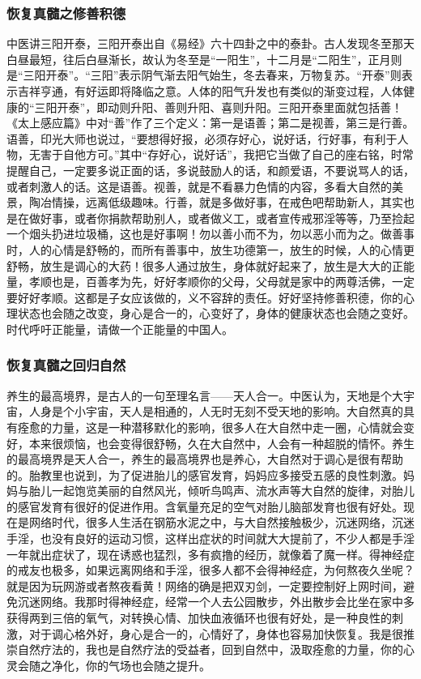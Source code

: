 \subsubsection{恢复真髓之修善积德}

中医讲三阳开泰，三阳开泰出自《易经》六十四卦之中的泰卦。古人发现冬至那天白昼最短，往后白昼渐长，故认为冬至是“一阳生”，十二月是“二阳生”，正月则是“三阳开泰”。“三阳”表示阴气渐去阳气始生，冬去春来，万物复苏。“开泰”则表示吉祥亨通，有好运即将降临之意。人体的阳气升发也有类似的渐变过程，人体健康的“三阳开泰”，即动则升阳、善则升阳、喜则升阳。三阳开泰里面就包括善！《太上感应篇》中对“善”作了三个定义：第一是语善；第二是视善，第三是行善。语善，印光大师也说过，“要想得好报，必须存好心，说好话，行好事，有利于人物，无害于自他方可。”其中“存好心，说好话”，我把它当做了自己的座右铭，时常提醒自己，一定要多说正面的话，多说鼓励人的话，和颜爱语，不要说骂人的话，或者刺激人的话。这是语善。视善，就是不看暴力色情的内容，多看大自然的美景，陶冶情操，远离低级趣味。行善，就是多做好事，在戒色吧帮助新人，其实也是在做好事，或者你捐款帮助别人，或者做义工，或者宣传戒邪淫等等，乃至捡起一个烟头扔进垃圾桶，这也是好事啊！勿以善小而不为，勿以恶小而为之。做善事时，人的心情是舒畅的，而所有善事中，放生功德第一，放生的时候，人的心情更舒畅，放生是调心的大药！很多人通过放生，身体就好起来了，放生是大大的正能量，孝顺也是，百善孝为先，好好孝顺你的父母，父母就是家中的两尊活佛，一定要好好孝顺。这都是子女应该做的，义不容辞的责任。好好坚持修善积德，你的心理状态也会随之改变，身心是合一的，心变好了，身体的健康状态也会随之变好。时代呼吁正能量，请做一个正能量的中国人。

\subsubsection{恢复真髓之回归自然}

养生的最高境界，是古人的一句至理名言——天人合一。中医认为，天地是个大宇宙，人身是个小宇宙，天人是相通的，人无时无刻不受天地的影响。大自然真的具有痊愈的力量，这是一种潜移默化的影响，很多人在大自然中走一圈，心情就会变好，本来很烦恼，也会变得很舒畅，久在大自然中，人会有一种超脱的情怀。养生的最高境界是天人合一，养生的最高境界也是养心，大自然对于调心是很有帮助的。胎教里也说到，为了促进胎儿的感官发育，妈妈应多接受五感的良性刺激。妈妈与胎儿一起饱览美丽的自然风光，倾听鸟鸣声、流水声等大自然的旋律，对胎儿的感官发育有很好的促进作用。含氧量充足的空气对胎儿脑部发育也很有好处。现在是网络时代，很多人生活在钢筋水泥之中，与大自然接触极少，沉迷网络，沉迷手淫，也没有良好的运动习惯，这样出症状的时间就大大提前了，不少人都是手淫一年就出症状了，现在诱惑也猛烈，多有疯撸的经历，就像着了魔一样。得神经症的戒友也极多，如果远离网络和手淫，很多人都不会得神经症，为何熬夜久坐呢？就是因为玩网游或者熬夜看黄！网络的确是把双刃剑，一定要控制好上网时间，避免沉迷网络。我那时得神经症，经常一个人去公园散步，外出散步会比坐在家中多获得两到三倍的氧气，对转换心情、加快血液循环也很有好处，是一种良性的刺激，对于调心格外好，身心是合一的，心情好了，身体也容易加快恢复。我是很推崇自然疗法的，我也是自然疗法的受益者，回到自然中，汲取痊愈的力量，你的心灵会随之净化，你的气场也会随之提升。

